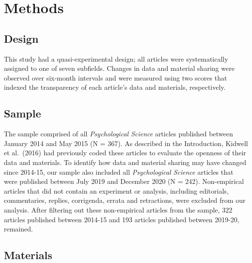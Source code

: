 \documentclass[
  english,
  man,floatsintext]{apa6}
\begin{document}
\hypertarget{methods}{%
\section{Methods}\label{methods}}

\hypertarget{design}{%
\subsection{Design}\label{design}}

This study had a quasi-experimental design; all articles were systematically assigned to one of seven subfields. Changes in data and material sharing were observed over six-month intervals and were measured using two scores that indexed the transparency of each article's data and materials, respectively.

\hypertarget{sample}{%
\subsection{Sample}\label{sample}}

The sample comprised of all \emph{Psychological Science} articles published between January 2014 and May 2015 (N = 367). As described in the Introduction, Kidwell et al.~(2016) had previously coded these articles to evaluate the openness of their data and materials. To identify how data and material sharing may have changed since 2014-15, our sample also included all \emph{Psychological Science} articles that were published between July 2019 and December 2020 (N = 242). Non-empirical articles that did not contain an experiment or analysis, including editorials, commentaries, replies, corrigenda, errata and retractions, were excluded from our analysis. After filtering out these non-empirical articles from the sample, 322 articles published between 2014-15 and 193 articles published between 2019-20, remained.

\hypertarget{materials}{%
\subsection{Materials}\label{materials}}
\end{document}
